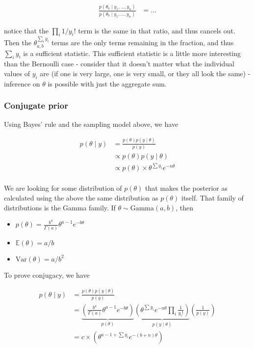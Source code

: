 \documentclass[
]{article}
\providecommand{\tightlist}{%
  \setlength{\itemsep}{0pt}\setlength{\parskip}{0pt}}
\begin{document}
\begin{align}
\frac{p(\theta_a \mid y_1, \dots, y_n)}{p(\theta_b \mid y_1, \dots, y_n)} &= \dots
\end{align}

notice that the \(\prod_i 1 / y_i !\) term is the same in that ratio,
and thus cancels out. Then the \(\theta_{a, b}^{\sum_i y_i}\) terms are
the only terms remaining in the fraction, and thus \(\sum_i y_i\) is a
sufficient statistic. This sufficient statistic is a little more
interesting than the Bernoulli case - consider that it doesn't matter
what the individual values of \(y_i\) are (if one is very large, one is
very small, or they all look the same) - inference on \(\theta\) is
possible with just the aggregate sum.

\hypertarget{conjugate-prior}{%
\subsubsection{Conjugate prior}\label{conjugate-prior}}

Using Bayes' rule and the sampling model above, we have

\begin{align}
p(\theta \mid y) &= \frac{p(\theta)p(y \mid \theta)}{p(y)} \\
&\propto p(\theta) p(y \mid \theta) \\
&\propto p(\theta) \times \theta^{\sum y_i} e^{-n\theta} \\
\end{align}

We are looking for some distribution of \(p(\theta)\) that makes the
posterior as calculated using the above the same distribution as
\(p(\theta)\) itself. That family of distributions is the Gamma family.
If \(\theta \sim \text{Gamma}(a, b)\), then

\begin{itemize}
\tightlist
\item
  \(p(\theta) = \frac{b^a}{\Gamma(a)}\theta^{a - 1} e^{-b \theta}\)
\item
  \(\mathbb{E}(\theta) = a/b\)
\item
  \(\text{Var}(\theta) = a/b^2\)
\end{itemize}

To prove conjugacy, we have

\begin{align}
p(\theta \mid y) &= \frac{p(\theta) p(y \mid \theta)}{p(y)} \\
&= \underbrace{\left( \frac{b^a}{\Gamma(a)} \theta^{a - 1} e^{-b \theta}
\right)}_{p(\theta)} \underbrace{\left( \theta^{\sum y_i} e^{-n \theta} \prod_i
\frac{1}{y_i !} \right)}_{p(y \mid \theta)} \left( \frac{1}{p(y)} \right) \\
&= c \times \left( \theta^{a - 1 + \sum y_i} e^{-(b + n) \theta} \right)
\end{align}
\end{document}
